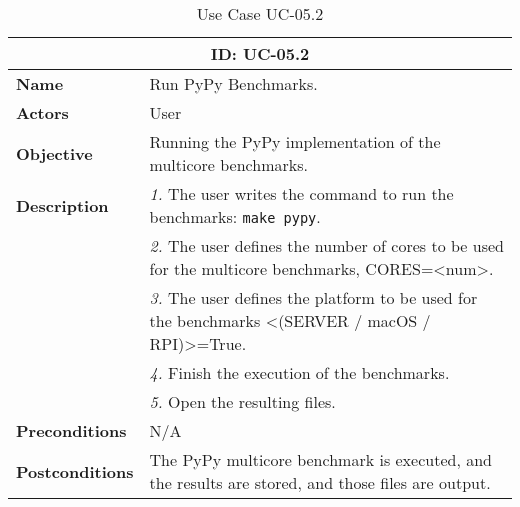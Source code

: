 \begin{table}[H]
    \centering
    \begin{tabular}{l p{10cm}}
        \toprule
        \multicolumn{2}{c}{\textbf{ID: UC-05.2}} \\
        \toprule
        \textbf{Name}                         &  Run PyPy Benchmarks. \\
        \textbf{Actors}                       &  User \\
        \textbf{Objective}                    &  Running the PyPy implementation of the multicore benchmarks. \\
        \multirow{1}{*}{\textbf{Description}} & \textsl{1.} The user writes the command to run the benchmarks: \texttt{make pypy}.\\
                                              & \textsl{2.} The user defines the number of cores to be used for the multicore benchmarks, CORES=<num>.\\
                                              & \textsl{3.} The user defines the platform to be used for the benchmarks <(SERVER / macOS / RPI)>=True.\\
                                              & \textsl{4.} Finish the execution of the benchmarks.\\
                                              & \textsl{5.} Open the resulting files.\\
        \textbf{Preconditions}                &  N/A \\
        \textbf{Postconditions}               &  The PyPy multicore benchmark is executed, and the results are stored, and those files are output. \\
    \end{tabular}
    \caption{Use Case UC-05.2}
    \label{tab:uc-05.2}
\end{table}



